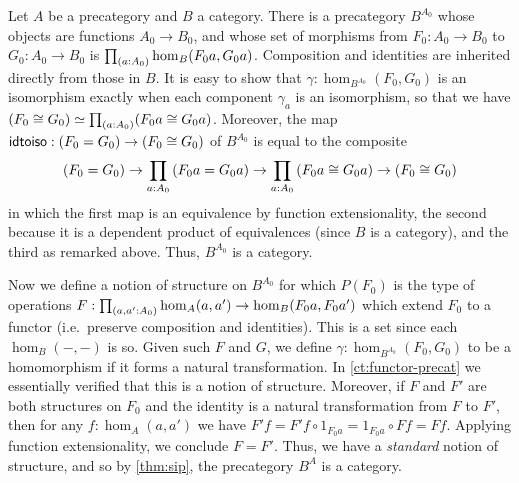 \begin{eg}\label{ct:sip-functor-cat}
  Let $A$ be a precategory and $B$ a category.
  There is a precategory $B^{A_0}$ whose objects are functions $A_0 \to B_0$, and whose set of morphisms from $F_0:A_0 \to B_0$ to $G_0:A_0 \to B_0$ is $\prd{a:A_0} \hom_B(F_0 a, G_0 a)$.
  Composition and identities are inherited directly from those in $B$.
  It is easy to show that $\gamma:\hom_{B^{A_0}}(F_0, G_0)$ is an isomorphism exactly when each component $\gamma_a$ is an isomorphism, so that we have $\eqv{(F_0 \cong G_0)}{\prd{a:A_0} (F_0 a \cong G_0 a)}$.
  Moreover, the map $\mathsf{idtoiso} : (F_0 = G_0) \to (F_0 \cong G_0)$ of $B^{A_0}$ is equal to the composite
  \[ (F_0 = G_0) \to \prd{a:A_0} (F_0 a  = G_0 a) \to \prd{a:A_0} (F_0 a \cong G_0 a) \to (F_0 \cong G_0) \]
  in which the first map is an equivalence by function extensionality, the second because it is a dependent product of equivalences (since $B$ is a category), and the third as remarked above.
  Thus, $B^{A_0}$ is a category.

  Now we define a notion of structure on $B^{A_0}$ for which $P(F_0)$ is the type of operations $F:\prd{a,a':A_0} \hom_A(a,a') \to \hom_B(F_0 a,F_0 a')$ which extend $F_0$ to a functor (i.e.\ preserve composition and identities).
  This is a set since each $\hom_B(-,-)$ is so.
  Given such $F$ and $G$, we define $\gamma:\hom_{B^{A_0}}(F_0, G_0)$ to be a homomorphism if it forms a natural transformation.
  In \autoref{ct:functor-precat} we essentially verified that this is a notion of structure.
  Moreover, if $F$ and $F'$ are both structures on $F_0$ and the identity is a natural transformation from $F$ to $F'$, then for any $f:\hom_A(a,a')$ we have $F'f = F'f \circ 1_{F_0 a} = 1_{F_0 a}\circ F f = F f$.
  Applying function extensionality, we conclude $F = F'$.
  Thus, we have a \emph{standard} notion of structure, and so by \autoref{thm:sip}, the precategory $B^A$ is a category.
\end{eg}

